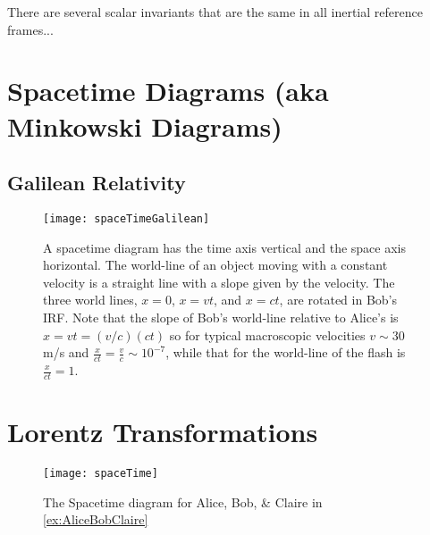 \documentclass[12pt,oneside]{book}
\begin{document}
There are several scalar invariants that are the same in all inertial reference frames...
\section{Spacetime Diagrams (aka Minkowski Diagrams)}

\subsection{Galilean Relativity}

\begin{figure*}
\centering
\texttt{[image: spaceTimeGalilean]}
\caption{
A spacetime diagram has the time axis vertical and the space axis horizontal. The world-line of an object moving with a constant velocity is a straight line with a slope given by the velocity.
The three world lines, $x=0$, $x=vt$, and $x=ct$, are rotated in Bob's IRF.
Note that the slope of Bob's world-line relative to Alice's is $x=vt=(v/c) (ct)$ so for typical macroscopic velocities $v\sim 30 $ m/s and 
$\frac{x}{ct} = \frac{v}{c} \sim 10^{-7}$, while that for the world-line of the flash is $\frac{x}{ct}=1$.
}
\label{worldline1.fig}
\end{figure*}

\section{Lorentz Transformations}

\begin{figure}
\centering\texttt{[image: spaceTime]}
\caption{The Spacetime diagram for Alice, Bob, \& Claire in \autoref{ex:AliceBobClaire}}
\end{figure}
\end{document}
